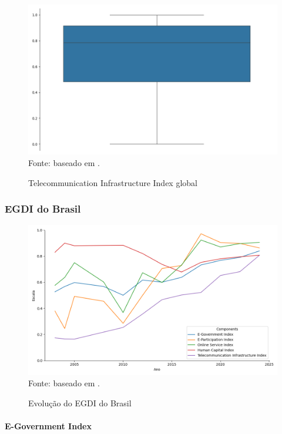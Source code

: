 \begin{figure}[H]
	\centering
	\caption{Telecommunication Infrastructure Index global}
	\includegraphics[width=1\linewidth]{figuras/egdi/boxplot_tci_global.png}
	\label{fig:boxplot_tci_global}
	\footnotesize{Fonte: baseado em \cite{ONU_edgi_mapa}.}
\end{figure}

\subsubsection{EGDI do Brasil}

\begin{figure}[H]
	\centering
	\caption{Evolução do EGDI do Brasil}
	\includegraphics[width=1\linewidth]{figuras/egdi/lineplot_egdi_brasil.png}
	\label{fig:lineplot_egdi_brasil}
	\footnotesize{Fonte: baseado em \cite{ONU_edgi_mapa}.}
\end{figure}

\paragraph{E-Government Index}

